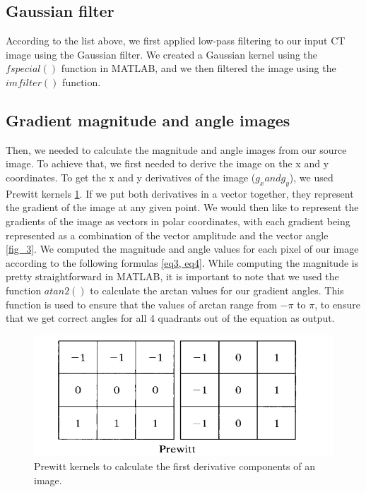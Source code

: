 \documentclass[9pt]{IEEEtran}
\begin{document}
\subsection{Gaussian filter}
According to the list above, we first applied low-pass filtering to our input CT image using the Gaussian filter. We created a Gaussian kernel using the $fspecial()$ function in MATLAB, and we then filtered the image using the $imfilter()$ function. 

\subsection{Gradient magnitude and angle images}
Then, we needed to calculate the magnitude and angle images from our source image. To achieve that, we first needed to derive the image on the x and y coordinates. To get the x and y derivatives of the image ($g_x and g_y$), we used Prewitt kernels \ref{fig_2}. If we put both derivatives in a vector together, they represent the gradient of the image at any given point. We would then like to represent the gradients of the image as vectors in polar coordinates, with each gradient being represented as a combination of the vector amplitude and the vector angle \ref{fig_3}. We computed the magnitude and angle values for each pixel of our image according to the following formulas \ref{eq3, eq4}. While computing the magnitude is pretty straightforward in MATLAB, it is important to note that we used the function $atan2()$ to calculate the arctan values for our gradient angles. This function is used to ensure that the values of arctan range from $-\pi$ to $\pi$, to ensure that we get correct angles for all 4 quadrants out of the equation as output.

\begin{figure}[!htb]
\centering
\includegraphics[width=1\columnwidth]{prewitt.png}
\caption[c1]{ Prewitt kernels to calculate the first derivative components of an image. }
\label{fig_2}
\end{figure}
\end{document}
